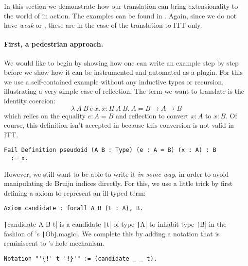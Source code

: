 In this section we demonstrate how our translation can bring extensionality to
the world of \Coq in action. The examples can be found in
.
Again, since we do not have \emph{weak} \Coq or \MetaCoq, these are in the case
of the translation to \acrshort{ITT} only.

\paragraph{First, a pedestrian approach.}
%
We would like to begin by showing how one can write an example step by step
before we show how it can be instrumented and automated as a plugin.
For this we use a self-contained example without any inductive
types or recursion, illustrating a very simple case of reflection.
The term we want to translate is the identity coercion:
\[
  \lambda\ A\ B\ e\ x.\ x : \Pi\ A\ B.\ A = B \to
  A \to B
\]
which relies on the equality \(e : A = B\) and reflection to convert  \(x : A\)
to \(x : B\).
%
Of course, this definition isn't accepted in \Coq because this
conversion is not valid in \acrshort{ITT}.
%
\begin{verbatim}
Fail Definition pseudoid (A B : Type) (e : A = B) (x : A) : B
  := x.
\end{verbatim}
%
However, we still want to be able to write it \emph{in some way}, in order to
avoid manipulating de Bruijn indices directly.
For this, we use a little trick by first defining a \Coq axiom to represent
an ill-typed term:
%
\begin{verbatim}
Axiom candidate : forall A B (t : A), B.
\end{verbatim}
%
\texttt|candidate A B t| is a candidate \texttt|t| of type
\texttt|A| to inhabit type \texttt|B| in the fashion of
\ocaml's \texttt|Obj.magic|.
We complete this by adding a notation that is reminiscent to \Agda's hole
mechanism.
%
\begin{verbatim}
Notation "'{!' t '!}'" := (candidate _ _ t).
\end{verbatim}

